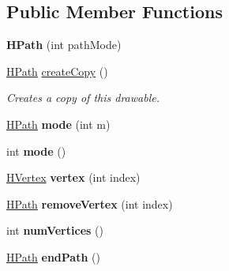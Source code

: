 \subsection*{Public Member Functions}
\begin{DoxyCompactItemize}
\item 
\hypertarget{classhype_1_1drawable_1_1_h_path_a4676c6d265941525f20e20b364fd1937}{{\bfseries H\-Path} (int path\-Mode)}\label{classhype_1_1drawable_1_1_h_path_a4676c6d265941525f20e20b364fd1937}

\item 
\hyperlink{classhype_1_1drawable_1_1_h_path}{H\-Path} \hyperlink{classhype_1_1drawable_1_1_h_path_acaea5912d0931f3c3e12a6294e8ba283}{create\-Copy} ()
\begin{DoxyCompactList}\small\item\em Creates a copy of this drawable. \end{DoxyCompactList}\item 
\hypertarget{classhype_1_1drawable_1_1_h_path_a780a179a20abbbe2960b3c2a6663c741}{\hyperlink{classhype_1_1drawable_1_1_h_path}{H\-Path} {\bfseries mode} (int m)}\label{classhype_1_1drawable_1_1_h_path_a780a179a20abbbe2960b3c2a6663c741}

\item 
\hypertarget{classhype_1_1drawable_1_1_h_path_a5660ce0ff6d511e224bf275cfeec8c48}{int {\bfseries mode} ()}\label{classhype_1_1drawable_1_1_h_path_a5660ce0ff6d511e224bf275cfeec8c48}

\item 
\hypertarget{classhype_1_1drawable_1_1_h_path_a7e591bbf1f7a5b2d71425e07cd7f8771}{\hyperlink{classhype_1_1drawable_1_1_h_path_1_1_h_vertex}{H\-Vertex} {\bfseries vertex} (int index)}\label{classhype_1_1drawable_1_1_h_path_a7e591bbf1f7a5b2d71425e07cd7f8771}

\item 
\hypertarget{classhype_1_1drawable_1_1_h_path_a65290bbef7be8e80f1384f884e781745}{\hyperlink{classhype_1_1drawable_1_1_h_path}{H\-Path} {\bfseries remove\-Vertex} (int index)}\label{classhype_1_1drawable_1_1_h_path_a65290bbef7be8e80f1384f884e781745}

\item 
\hypertarget{classhype_1_1drawable_1_1_h_path_a841accc08946b6d260dc933eaea95867}{int {\bfseries num\-Vertices} ()}\label{classhype_1_1drawable_1_1_h_path_a841accc08946b6d260dc933eaea95867}

\item 
\hypertarget{classhype_1_1drawable_1_1_h_path_a0c21a2817cb1840d50de03bfa7683842}{\hyperlink{classhype_1_1drawable_1_1_h_path}{H\-Path} {\bfseries end\-Path} ()}\label{classhype_1_1drawable_1_1_h_path_a0c21a2817cb1840d50de03bfa7683842}


\end{DoxyCompactItemize}
